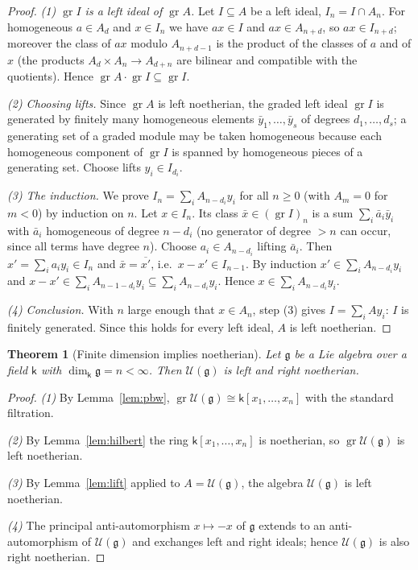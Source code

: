 \documentclass[11pt]{ctexart}
\theoremstyle{plain}
\newtheorem{theorem}{Theorem}[section]
\theoremstyle{definition}
\theoremstyle{remark}
\newcommand{\kk}{\mathsf{k}}
\newcommand{\gl}{\mathfrak{g}}
\newcommand{\UU}{\mathcal{U}}
\begin{document}
\begin{proof}
\emph{(1) $\operatorname{gr}I$ is a left ideal of $\operatorname{gr}A$.} Let
$I\subseteq A$ be a left ideal, $I_n=I\cap A_n$. For homogeneous $a\in A_d$ and
$x\in I_n$ we have $ax\in I$ and $ax\in A_{n+d}$, so $ax\in I_{n+d}$; moreover the
class of $ax$ modulo $A_{n+d-1}$ is the product of the classes of $a$ and of $x$
(the products $A_d\times A_n\to A_{d+n}$ are bilinear and compatible with the
quotients). Hence $\operatorname{gr}A\cdot\operatorname{gr}I\subseteq
\operatorname{gr}I$.

\emph{(2) Choosing lifts.} Since $\operatorname{gr}A$ is left noetherian, the graded
left ideal $\operatorname{gr}I$ is generated by finitely many homogeneous elements
$\bar y_1,\dots,\bar y_s$ of degrees $d_1,\dots,d_s$; a generating set of a graded
module may be taken homogeneous because each homogeneous component of
$\operatorname{gr}I$ is spanned by homogeneous pieces of a generating set. Choose
lifts $y_i\in I_{d_i}$.

\emph{(3) The induction.} We prove $I_n=\sum_i A_{n-d_i}y_i$ for all $n\ge0$ (with
$A_m=0$ for $m<0$) by induction on $n$. Let $x\in I_n$. Its class $\bar x\in
(\operatorname{gr}I)_n$ is a sum $\sum_i\bar a_i\bar y_i$ with $\bar a_i$ homogeneous
of degree $n-d_i$ (no generator of degree $>n$ can occur, since all terms have degree
$n$). Choose $a_i\in A_{n-d_i}$ lifting $\bar a_i$. Then
$x'=\sum_i a_iy_i\in I_n$ and $\bar x=\overline{x'}$, i.e.\ $x-x'\in I_{n-1}$. By
induction $x'\in\sum_i A_{n-d_i}y_i$ and $x-x'\in\sum_i A_{n-1-d_i}y_i\subseteq
\sum_i A_{n-d_i}y_i$. Hence $x\in\sum_i A_{n-d_i}y_i$.

\emph{(4) Conclusion.} With $n$ large enough that $x\in A_n$, step (3) gives
$I=\sum_i Ay_i$: $I$ is finitely generated. Since this holds for every left ideal,
$A$ is left noetherian.
\end{proof}

\begin{theorem}[Finite dimension implies noetherian]\label{thm:findim}
Let $\gl$ be a Lie algebra over a field $\kk$ with $\dim_\kk\gl=n<\infty$. Then
$\UU(\gl)$ is left and right noetherian.
\end{theorem}

\begin{proof}
\emph{(1)} By Lemma~\ref{lem:pbw}, $\operatorname{gr}\UU(\gl)\cong\kk[x_1,\dots,x_n]$
with the standard filtration.

\emph{(2)} By Lemma~\ref{lem:hilbert} the ring $\kk[x_1,\dots,x_n]$ is noetherian, so
$\operatorname{gr}\UU(\gl)$ is left noetherian.

\emph{(3)} By Lemma~\ref{lem:lift} applied to $A=\UU(\gl)$, the algebra $\UU(\gl)$ is
left noetherian.

\emph{(4)} The principal anti-automorphism $x\mapsto-x$ of $\gl$ extends to an
anti-automorphism of $\UU(\gl)$ and exchanges left and right ideals; hence
$\UU(\gl)$ is also right noetherian.
\end{proof}
\end{document}
